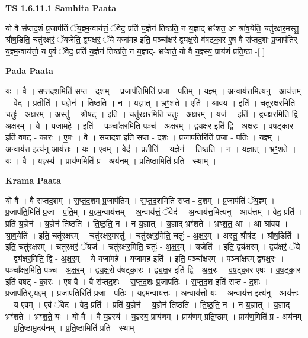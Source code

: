 \documentclass[17pt]{extarticle}
\begin{document}
\textbf{TS 1.6.11.1 } \newline
\textbf{Samhita Paata} \newline

यो वै स॑प्तद॒शं प्र॒जाप॑तिं ॅय॒ज्ञ्म॒न्वाय॑त्तं॒ ॅवेद॒ प्रति॑ य॒ज्ञेन॑ तिष्ठति॒ न य॒ज्ञाद् भ्रꣳ॑शत॒ आ श्रा॑व॒येति॒ चतु॑रक्षर॒मस्तु॒ श्रौष॒डिति॒ चतु॑रक्षरं॒ ॅयजेति॒ द्व्य॑क्षरं॒ ॅये यजा॑मह॒ इति॒ पञ्चा᳚क्षरं द्व्यक्ष॒रो व॑षट्का॒र ए॒ष वै स॑प्तद॒शः प्र॒जाप॑तिर् य॒ज्ञ्म॒न्वाय॑त्तो॒ य ए॒वं ॅवेद॒ प्रति॑ य॒ज्ञेन॑ तिष्ठति॒ न य॒ज्ञाद्- भ्रꣳ॑शते॒ यो वै य॒ज्ञ्स्य॒ प्राय॑णं प्रति॒ष्ठा -[ ] \newline

\textbf{Pada Paata} \newline

यः । वै । स॒प्त॒द॒शमिति॑ सप्त - द॒शम् । प्र॒जाप॑ति॒मिति॑ प्र॒जा - प॒ति॒म् । य॒ज्ञ्म् । अ॒न्वाय॑त्त॒मित्य॑नु - आय॑त्तम् । वेद॑ । प्रतीति॑ । य॒ज्ञेन॑ । ति॒ष्ठ॒ति॒ । न । य॒ज्ञात् । भ्रꣳ॒॒श॒ते॒ । एति॑ । श्रा॒व॒य॒ । इति॑ । चतु॑रक्षर॒मिति॒ चतुः॑ - अ॒क्ष॒र॒म् । अस्तु॑ । श्रौष॑ट् । इति॑ । चतु॑रक्षर॒मिति॒ चतुः॑ - अ॒क्ष॒र॒म् । यज॑ । इति॑ । द्व्य॑क्षर॒मिति॒ द्वि - अ॒क्ष॒र॒म् । ये । यजा॑महे । इति॑ । पञ्चा᳚क्षर॒मिति॒ पञ्च॑ - अ॒क्ष॒र॒म् । द्व्य॒क्ष॒र इति॑ द्वि - अ॒क्ष॒रः । व॒ष॒ट्का॒र इति॑ वषट् - का॒रः । ए॒षः । वै । स॒प्त॒द॒श इति॑ सप्त - द॒शः । प्र॒जाप॑ति॒रिति॑ प्र॒जा - प॒तिः॒ । य॒ज्ञ्म् । अ॒न्वाय॑त्त॒ इत्य॑नु-आय॑त्तः । यः । ए॒वम् । वेद॑ । प्रतीति॑ । य॒ज्ञेन॑ । ति॒ष्ठ॒ति॒ । न । य॒ज्ञात् । भ्रꣳ॒॒श॒ते॒ । यः । वै । य॒ज्ञ्स्य॑ । प्राय॑ण॒मिति॑ प्र - अय॑नम् । प्र॒ति॒ष्ठामिति॑ प्रति - स्थाम् ।  \newline


\textbf{Krama Paata} \newline

यो वै । वै स॑प्तद॒शम् । स॒प्त॒द॒शम् प्र॒जाप॑तिम् । स॒प्त॒द॒शमिति॑ सप्त - द॒शम् । प्र॒जाप॑तिं ॅय॒ज्ञ्म् । प्र॒जाप॑ति॒मिति॑ प्र॒जा - प॒ति॒म् । य॒ज्ञ्म॒न्वाय॑त्तम् । अ॒न्वाय॑त्तं॒ ॅवेद॑ । अ॒न्वाय॑त्त॒मित्य॑नु - आय॑त्तम् । वेद॒ प्रति॑ । प्रति॑ य॒ज्ञेन॑ । य॒ज्ञेन॑ तिष्ठति । ति॒ष्ठ॒ति॒ न । न य॒ज्ञात् । य॒ज्ञाद् भ्रꣳ॑शते । भ्रꣳ॒॒श॒त॒ आ । आ श्रा॑वय । श्रा॒व॒येति॑ । इति॒ चतु॑रक्षरम् । चतु॑रक्षर॒मस्तु॑ । चतु॑रक्षर॒मिति॒ चतुः॑ - अ॒क्ष॒र॒म् । अस्तु॒ श्रौष॑ट् । श्रौष॒डिति॑ । इति॒ चतु॑रक्षरम् । चतु॑रक्षरं॒ ॅयज॑ । चतु॑रक्षर॒मिति॒ चतुः॑ - अ॒क्ष॒र॒म् । यजेति॑ । इति॒ द्व्य॑क्षरम् । द्व्य॑क्षरं॒ ॅये । द्व्य॑क्षर॒मिति॒ द्वि - अ॒क्ष॒र॒म् । ये यजा॑महे । यजा॑मह॒ इति॑ । इति॒ पञ्चा᳚क्षरम् । पञ्चा᳚क्षरम् द्व्यक्ष॒रः । पञ्चा᳚क्षर॒मिति॒ पञ्च॑ - अ॒क्ष॒र॒म् । द्व्य॒क्ष॒रो व॑षट्का॒रः । द्व्य॒क्ष॒र इति॑ द्वि - अ॒क्ष॒रः । व॒ष॒ट्का॒र ए॒षः । व॒ष॒ट्का॒र इति॑ वषट् - का॒रः । ए॒ष वै । वै स॑प्तद॒शः । स॒प्त॒द॒शः प्र॒जाप॑तिः । स॒प्त॒द॒श इति॑ सप्त - द॒शः । प्र॒जाप॑तिर्,य॒ज्ञ्म् । प्र॒जाप॑ति॒रिति॑ प्र॒जा - प॒तिः॒ । य॒ज्ञ्म॒न्वाय॑त्तः । अ॒न्वाय॑त्तो॒ यः । अ॒न्वाय॑त्त॒ इत्य॑नु - आय॑त्तः । य ए॒वम् । ए॒वं ॅवेद॑ । वेद॒ प्रति॑ । प्रति॑ य॒ज्ञेन॑ । य॒ज्ञेन॑ तिष्ठति । ति॒ष्ठ॒ति॒ न । न य॒ज्ञात् । य॒ज्ञाद् भ्रꣳ॑शते । भ्रꣳ॒॒श॒ते॒ यः । यो वै । वै य॒ज्ञ्स्य॑ । य॒ज्ञ्स्य॒ प्राय॑णम् । प्राय॑णम् प्रति॒ष्ठाम् । प्राय॑ण॒मिति॑ प्र - अय॑नम् । प्र॒ति॒ष्ठामु॒दय॑नम् । प्र॒ति॒ष्ठामिति॑ प्रति - स्थाम् \newline
\end{document}
